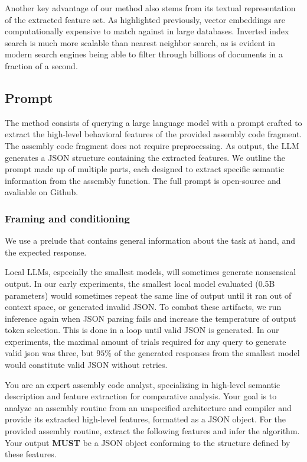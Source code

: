 Another key advantage of our method also stems from its textual representation of the extracted feature set. As highlighted
previously, vector embeddings are computationally expensive to match against in large databases. Inverted index search is much
more scalable than nearest neighbor search, as is evident in modern search engines being able to filter through billions of documents
in a fraction of a second.

\subsection{Prompt}

The method consists of querying a large language model with a prompt crafted to extract the high-level behavioral features of
the provided assembly code fragment. The assembly code fragment does not require preprocessing. As output, the LLM generates a JSON
structure containing the extracted features. We outline the prompt made up of multiple parts, each designed to
extract specific semantic information from the assembly function. The full prompt is open-source and avaliable on Github.

\subsubsection{Framing and conditioning}

We use a prelude that contains general information about the task at hand, and the expected response.

Local LLMs, especially the smallest models, will sometimes generate nonsensical output. In our early experiments, the smallest local model
evaluated (0.5B parameters) would sometimes repeat the same line of output until it ran out of context space, or generated invalid JSON.
To combat these artifacts, we run inference again when JSON parsing fails and increase the temperature of output token
selection. This is done in a loop until valid JSON is generated. In our experiments, the maximal amount of trials required
for any query to generate valid json was three, but \(95\%\) of the generated responses from the smallest model would constitute
valid JSON without retries.

\begin{tcolorbox}[enhanced]
You are an expert assembly code analyst, specializing in high-level semantic description and feature extraction for comparative
analysis. Your goal is to analyze an assembly routine from an unspecified architecture and compiler and provide its extracted
high-level features, formatted as a JSON object. For the provided assembly routine, extract the following features and infer the
algorithm. Your output \textbf{MUST} be a JSON object conforming to the structure defined by these features.
\end{tcolorbox}

